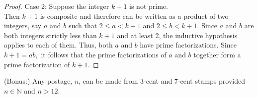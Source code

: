 \documentclass[12pt]{article}
\newcommand{\N}{\mathbb{N}}
\begin{document}
\begin{enumerate}
\begin{proof}
Case 2: Suppose the integer $k+1$ is not prime.\\
Then $k+1$ is composite and therefore can be written as a product of two integers, say $a$ and $b$ such that $2 \leq a < k+1$ and $2 \leq b < k+1.$ Since $a$ and $b$ are both integers strictly less than $k+1$ and at least 2, the inductive hypothesis applies to each of them. Thus, both $a$ and $b$ have prime factorizations. Since $k+1=ab,$ it follows that the prime factorizations of $a$ and $b$ together form a prime factorization of $k+1.$
\end{proof}
\vfill
(Bonus:) Any postage, $n$, can be made from 3-cent and 7-cent stamps provided $n\in \N$ and $n>12.$

\end{enumerate}
\end{document}
